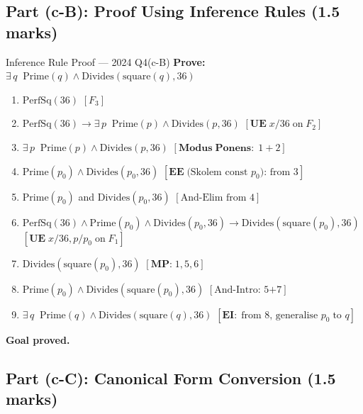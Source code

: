 \documentclass[12pt,a4paper]{article}
\newcommand{\EX}[1]{\exists\,#1\;}
\newcommand{\ra}{\rightarrow}
\begin{document}
\subsection{Part (c-B): Proof Using Inference Rules (1.5 marks)}

\begin{solbox}{Inference Rule Proof --- 2024 Q4(c-B)}
\textbf{Prove:} $\EX{q}\;\mathrm{Prime}(q)\land\mathrm{Divides}(\mathrm{square}(q),36)$

\begin{enumerate}[noitemsep,label=\textbf{\arabic*.}]
  \item $\mathrm{PerfSq}(36)$ \hfill $[F_3]$
  \item $\mathrm{PerfSq}(36) \ra \EX{p}\;\mathrm{Prime}(p)\land\mathrm{Divides}(p,36)$ \hfill $[\mathbf{UE}\;x/36\;\text{on}\;F_2]$
  \item $\EX{p}\;\mathrm{Prime}(p)\land\mathrm{Divides}(p,36)$ \hfill $[\mathbf{Modus\;Ponens:}\;1+2]$
  \item $\mathrm{Prime}(p_0)\land\mathrm{Divides}(p_0,36)$ \hfill $[\mathbf{EE}\;\text{(Skolem const }p_0\text{): from 3}]$
  \item $\mathrm{Prime}(p_0)$ and $\mathrm{Divides}(p_0,36)$ \hfill $[\text{And-Elim from 4}]$
  \item $\mathrm{PerfSq}(36)\land\mathrm{Prime}(p_0)\land\mathrm{Divides}(p_0,36) \ra \mathrm{Divides}(\mathrm{square}(p_0),36)$\hfill $[\mathbf{UE}\;x/36,p/p_0\;\text{on}\;F_1]$
  \item $\mathrm{Divides}(\mathrm{square}(p_0),36)$ \hfill $[\textbf{MP:}\;1,5,6]$
  \item $\mathrm{Prime}(p_0)\land\mathrm{Divides}(\mathrm{square}(p_0),36)$ \hfill $[\text{And-Intro: 5+7}]$
  \item $\EX{q}\;\mathrm{Prime}(q)\land\mathrm{Divides}(\mathrm{square}(q),36)$ \hfill $[\mathbf{EI:}\;\text{from 8, generalise }p_0\;\text{to }q]$
\end{enumerate}
\textbf{Goal proved.} \checkmark
\end{solbox}

\subsection{Part (c-C): Canonical Form Conversion (1.5 marks)}
\end{document}
